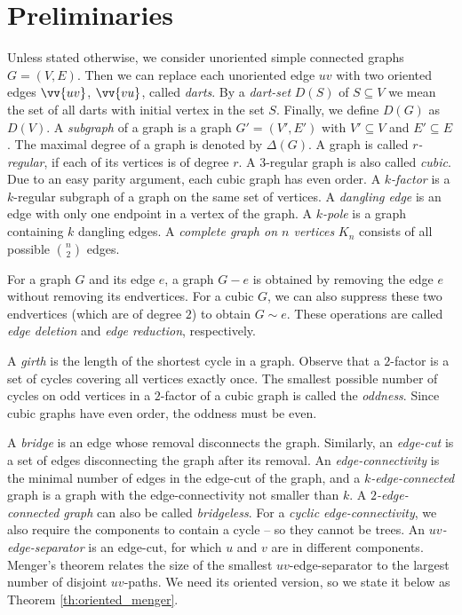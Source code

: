 \chapter{Preliminaries}

Unless stated otherwise, we consider unoriented simple connected graphs $G=(V,E)$. Then we can replace each unoriented edge $uv$ with two oriented edges $\vv{uv}$, $\vv{vu}$, called \emph{darts}. By a \emph{dart-set} $D(S)$ of $S\subseteq V$ we mean the set of all darts with initial vertex in the set $S$. Finally, we define $D(G)$ as $D(V)$. A \emph{subgraph} of a graph is a graph $G'=(V', E')$ with $V'\subseteq V$ and $E'\subseteq E$. The maximal degree of a graph is denoted by $\Delta(G)$. A graph is called \emph{$r$-regular}, if each of its vertices is of degree $r$. A $3$-regular graph is also called \emph{cubic}. Due to an easy parity argument, each cubic graph has even order. A \emph{$k$-factor} is a $k$-regular subgraph of a graph on the same set of vertices. A \emph{dangling edge} is an edge with only one endpoint in a vertex of the graph. A \emph{$k$-pole} is a graph containing $k$ dangling edges. A \emph{complete graph on $n$ vertices} $K_n$ consists of all possible $\binom{n}{2}$ edges.

For a graph $G$ and its edge $e$, a graph $G-e$ is obtained by removing the edge $e$ without removing its endvertices. For a cubic $G$, we can also suppress these two endvertices (which are of degree $2$) to obtain $G\sim e$. These operations are called \emph{edge deletion} and \emph{edge reduction}, respectively.

A \emph{girth} is the length of the shortest cycle in a graph. Observe that a $2$-factor is a set of cycles covering all vertices exactly once. The smallest possible number of cycles on odd vertices in a $2$-factor of a cubic graph is called the \emph{oddness}. Since cubic graphs have even order, the oddness must be even.

A \emph{bridge} is an edge whose removal disconnects the graph. Similarly, an \emph{edge-cut} is a set of edges disconnecting the graph after its removal. An \emph{edge-connectivity} is the minimal number of edges in the edge-cut of the graph, and a \emph{$k$-edge-connected} graph is a graph with the edge-connectivity not smaller than $k$. A \emph{$2$-edge-connected graph} can also be called \emph{bridgeless}. For a \emph{cyclic edge-connectivity}, we also require the components to contain a cycle – so they cannot be trees. An \emph{$uv$-edge-separator} is an edge-cut, for which $u$ and $v$ are in different components. Menger's theorem \cite{menger} relates the size of the smallest $uv$-edge-separator to the largest number of disjoint $uv$-paths. We need its oriented version, so we state it below as Theorem \ref{th:oriented_menger}.

